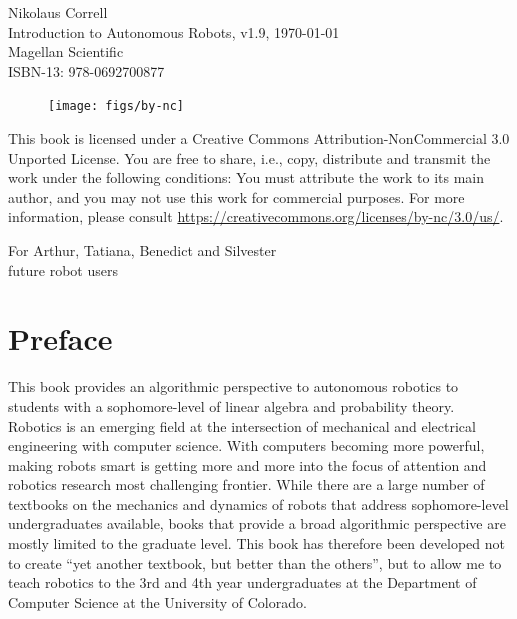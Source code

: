 \documentclass[paper=6.14in:9.21in,pagesize=pdftex,11pt,twoside,openright]{scrbook}
\begin{document}

\thispagestyle{empty}
\begin{flushleft}
Nikolaus Correll\\
Introduction to Autonomous Robots, v1.9, \today\\
Magellan Scientific\\
ISBN-13: 978-0692700877
\end{flushleft}

\vfill

\begin{figure}[!h]
\texttt{[image: figs/by-nc]}
\end{figure}

This book is licensed under a Creative Commons Attribution-NonCommercial 3.0 Unported License. You are free to share, i.e., copy, distribute and transmit the work under the following conditions: You must attribute the work to its main author, and you may not use this work for commercial purposes. For more information, please consult \url{https://creativecommons.org/licenses/by-nc/3.0/us/}.


\cleardoublepage
\thispagestyle{empty}
\vspace*{\fill}
\begin{center}
For Arthur, Tatiana, Benedict and Silvester\\
future robot users
\end{center}
\vspace*{\fill}

\tableofcontents

\chapter*{Preface}
This book provides an algorithmic perspective to autonomous robotics to students with a sophomore-level of linear algebra and probability theory. Robotics is an emerging field at the intersection of mechanical and electrical engineering with computer science. With computers becoming more powerful, making robots smart is getting more and more into the focus of attention and robotics research most challenging frontier. While there are a large number of textbooks on the mechanics and dynamics of robots that address sophomore-level undergraduates available, books that provide a broad algorithmic perspective are mostly limited to the graduate level. This book has therefore been developed not to create ``yet another textbook, but better than the others'', but to allow me to teach robotics to the 3rd and 4th year undergraduates at the Department of Computer Science at the University of Colorado.
\end{document}
